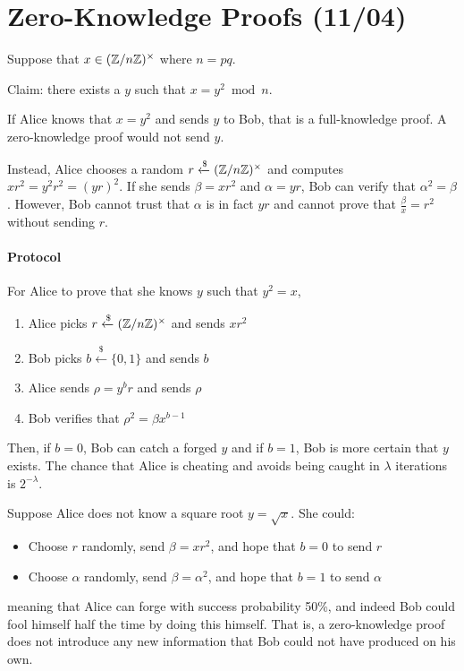 \documentclass[notes]{agony}
\newcommand{\xgets}{\xleftarrow}
\newcommand{\ndgets}{\xgets{\mathdollar}}
\newcommand{\mgrp}[1]{(\Z/#1\Z)^\times}
\begin{document}
\section{Zero-Knowledge Proofs (11/04)}

Suppose that $x \in \mgrp{n}$ where $n = pq$.

Claim: there exists a $y$ such that $x = y^2 \bmod n$.

If Alice knows that $x = y^2$ and sends $y$ to Bob,
that is a full-knowledge proof.
A zero-knowledge proof would not send $y$.

Instead, Alice chooses a random $r \ndgets \mgrp{n}$
and computes $xr^2 = y^2r^2 = (yr)^2$.
If she sends $\beta = xr^2$ and $\alpha = yr$,
Bob can verify that $\alpha^2 = \beta$.
However, Bob cannot trust that $\alpha$ is in fact $yr$
and cannot prove that $\frac{\beta}{x} = r^2$ without sending $r$.

\paragraph{Protocol} For Alice to prove that she knows $y$ such that $y^2 = x$,
\begin{enumerate}[1.,nosep]
  \item Alice picks $r \ndgets \mgrp{n}$ and sends $xr^2$
  \item Bob picks $b \ndgets \{0,1\}$ and sends $b$
  \item Alice sends $\rho = y^b r$ and sends $\rho$
  \item Bob verifies that $\rho^2 = \beta x^{b-1}$
\end{enumerate}
Then, if $b=0$, Bob can catch a forged $y$ and if $b=1$, Bob is more certain that $y$ exists.
The chance that Alice is cheating and avoids being caught
in $\lambda$ iterations is $2^{-\lambda}$.

Suppose Alice does not know a square root $y = \sqrt{x}$. She could:
\begin{itemize}[nosep]
  \item Choose $r$ randomly, send $\beta = xr^2$, and hope that $b=0$ to send $r$
  \item Choose $\alpha$ randomly, send $\beta = \alpha^2$, and hope that $b=1$ to send $\alpha$
\end{itemize}
meaning that Alice can forge with success probability 50\%,
and indeed Bob could fool himself half the time by doing this himself.
That is, a zero-knowledge proof does not introduce any new information
that Bob could not have produced on his own.
\end{document}
